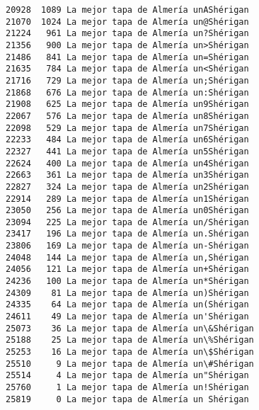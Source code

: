 \documentclass[11pt]{article}
\begin{document}
\begin{Verbatim}[commandchars=\\\{\}]
20928  1089 La mejor tapa de Almería unAShérigan
21070  1024 La mejor tapa de Almería un@Shérigan
21224   961 La mejor tapa de Almería un?Shérigan
21356   900 La mejor tapa de Almería un>Shérigan
21486   841 La mejor tapa de Almería un=Shérigan
21635   784 La mejor tapa de Almería un<Shérigan
21716   729 La mejor tapa de Almería un;Shérigan
21868   676 La mejor tapa de Almería un:Shérigan
21908   625 La mejor tapa de Almería un9Shérigan
22067   576 La mejor tapa de Almería un8Shérigan
22098   529 La mejor tapa de Almería un7Shérigan
22233   484 La mejor tapa de Almería un6Shérigan
22327   441 La mejor tapa de Almería un5Shérigan
22624   400 La mejor tapa de Almería un4Shérigan
22663   361 La mejor tapa de Almería un3Shérigan
22827   324 La mejor tapa de Almería un2Shérigan
22914   289 La mejor tapa de Almería un1Shérigan
23050   256 La mejor tapa de Almería un0Shérigan
23094   225 La mejor tapa de Almería un/Shérigan
23417   196 La mejor tapa de Almería un.Shérigan
23806   169 La mejor tapa de Almería un-Shérigan
24048   144 La mejor tapa de Almería un,Shérigan
24056   121 La mejor tapa de Almería un+Shérigan
24236   100 La mejor tapa de Almería un*Shérigan
24309    81 La mejor tapa de Almería un)Shérigan
24335    64 La mejor tapa de Almería un(Shérigan
24611    49 La mejor tapa de Almería un'Shérigan
25073    36 La mejor tapa de Almería un\&Shérigan
25188    25 La mejor tapa de Almería un\%Shérigan
25253    16 La mejor tapa de Almería un\$Shérigan
25510     9 La mejor tapa de Almería un\#Shérigan
25514     4 La mejor tapa de Almería un"Shérigan
25760     1 La mejor tapa de Almería un!Shérigan
25819     0 La mejor tapa de Almería un Shérigan

    \end{Verbatim}


    
    
    
    
\end{document}

